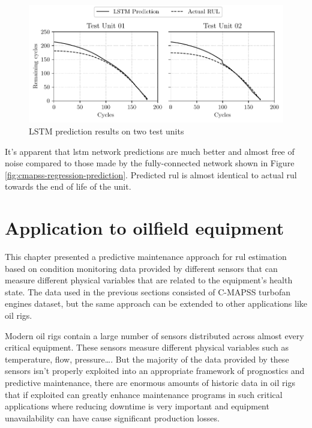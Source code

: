 \begin{figure}[h]
    \centering
    \includegraphics{figures/cmapss_lstm_regression_predictions.pdf}
    \caption{LSTM prediction results on two test units}
    \label{fig:cmapss-lstm-prediction}
\end{figure}

It's apparent that \acrshort{lstm} network predictions are much better and almost free of noise compared to those made by the fully-connected network shown in Figure \ref{fig:cmapss-regression-prediction}. Predicted \acrshort{rul} is almost identical to actual \acrshort{rul} towards the end of life of the unit.


\section{Application to oilfield equipment}%
\label{sec:application_to_oilfield_equipment_1}
This chapter presented a predictive maintenance approach for \acrshort{rul} estimation based on condition monitoring data provided by different sensors that can measure different physical variables that are related to the equipment's health state. The data used in the previous sections consisted of C-MAPSS turbofan engines dataset, but the same approach can be extended to other applications like oil rigs.

Modern oil rigs contain a large number of sensors distributed across almost every critical equipment. These sensors measure different physical variables such as temperature, flow, pressure…. But the majority of the data provided by these sensors isn't properly exploited into an appropriate framework of prognostics and predictive maintenance, there are enormous amounts of historic data in oil rigs that if exploited can greatly enhance maintenance programs in such critical applications where reducing downtime is very important and equipment unavailability can have cause significant production losses.

